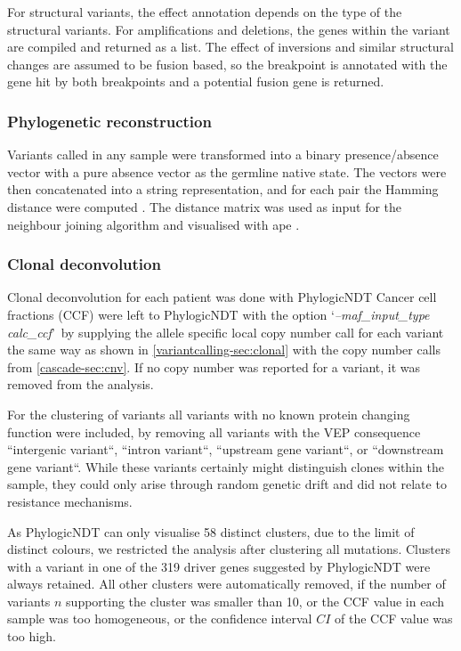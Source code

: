 For structural variants, the effect annotation depends on the type of the structural variants. For amplifications and deletions, the genes within the variant are compiled and returned as a list. The effect of inversions and similar structural changes are assumed to be fusion based, so the breakpoint is annotated with the gene hit by both breakpoints and a potential fusion gene is returned.


\subsubsection{Phylogenetic reconstruction}
\label{cascade-sec:phylo}
Variants called in any sample were transformed into a binary presence/absence vector with a pure absence vector as the germline native state. The vectors were then concatenated into a string representation, and for each pair the Hamming distance were computed \cite{Hamming1950}. The distance matrix was used as input for the neighbour joining algorithm and visualised with ape \cite{Paradis2018}.


\subsubsection{Clonal deconvolution}
\label{cascade-sec:clonaldecon}

Clonal deconvolution for each patient was done with PhylogicNDT Cancer cell fractions (CCF) were left to PhylogicNDT with the option \lq\emph{--maf\_input\_type calc\_ccf}\rq\ by supplying the allele specific local copy number call for each variant the same way as shown in \autoref{variantcalling-sec:clonal} with the copy number calls from \autoref{cascade-sec:cnv}. If no copy number was reported for a variant, it was removed from the analysis.

For the clustering of variants all variants with no known protein changing function were included, by removing all variants with the VEP consequence ``intergenic variant``, ``intron variant``, ``upstream gene variant``, or ``downstream gene variant``. While these variants certainly might distinguish clones within the sample, they could only arise through random genetic drift and did not relate to resistance mechanisms. 

As PhylogicNDT can only visualise 58 distinct clusters, due to the limit of distinct colours, we restricted the analysis after clustering all mutations. Clusters with a variant in one of the 319 driver genes suggested by PhylogicNDT were always retained. All other clusters were automatically removed, if the number of variants $n$ supporting the cluster was smaller than 10, or the CCF value in each sample was too homogeneous, or the confidence interval $CI$ of the CCF value was too high.

